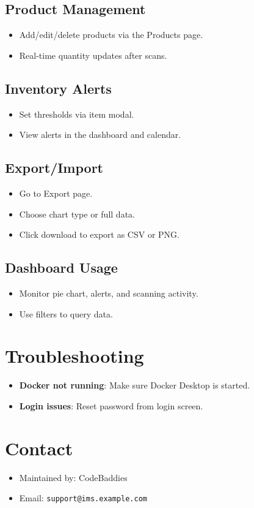 \documentclass[12pt]{article}
\begin{document}
	\subsection{Product Management}
	\begin{itemize}[nosep]
		\item Add/edit/delete products via the Products page.
		\item Real-time quantity updates after scans.
	\end{itemize}
	
	\subsection{Inventory Alerts}
	\begin{itemize}[nosep]
		\item Set thresholds via item modal.
		\item View alerts in the dashboard and calendar.
	\end{itemize}
	
	\subsection{Export/Import}
	\begin{itemize}[nosep]
		\item Go to Export page.
		\item Choose chart type or full data.
		\item Click download to export as CSV or PNG.
	\end{itemize}
	
	\subsection{Dashboard Usage}
	\begin{itemize}[nosep]
		\item Monitor pie chart, alerts, and scanning activity.
		\item Use filters to query data.
	\end{itemize}
	
	\section{Troubleshooting}
	\begin{itemize}[nosep]
		\item \textbf{Docker not running}: Make sure Docker Desktop is started.
		\item \textbf{Login issues}: Reset password from login screen.
	\end{itemize}
	
	\section{Contact}
	\begin{itemize}[nosep]
		\item Maintained by: CodeBaddies
		\item Email: \texttt{support@ims.example.com}
	\end{itemize}
	
\end{document}

